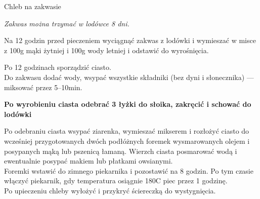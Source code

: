 \documentclass[a4paper,12pt]{article}
\begin{document}
\newpage
\begin{recipe}{Chleb na zakwasie}{}{}
\freeform%
\begin{center}
\textit{Zakwas można trzymać w lodówce 8 dni.}
\end{center}


Na 12 godzin przed pieczeniem wyciągnąć zakwas z lodówki i wymieszać w misce z 100g mąki żytniej i 100g wody letniej i odstawić do wyrośnięcia.

\freeform%
Po 12 godzinach sporządzić ciasto. \\

Do zakwasu dodać wody, wsypać wszystkie składniki (bez dyni i słonecznika) --- miksować przez 5--10min.\\

\begin{center}
\textbf{Po wyrobieniu ciasta odebrać 3 łyżki do słoika, zakręcić i schować do lodówki}\\
\end{center}

Po odebraniu ciasta wsypać ziarenka, wymieszać mikserem i rozłożyć ciasto do wcześniej przygotowanych dwóch podłóżnych foremek wysmarowanych olejem i posypanych mąką lub pszenicą łamaną. Wierzch ciasta posmarować wodą i
ewentualnie posypać makiem lub płatkami owsianymi.\\

Foremki wstawić do zimnego piekarnika i pozostawić na 8 godzin. Po tym czasie włączyć piekarnik, gdy temperatura osiągnie 180\0C piec przez 1 godzinę.\\

Po upieczeniu chleby wyłożyć i przykryć ściereczką do wystygnięcia.

\end{recipe}
\end{document}
